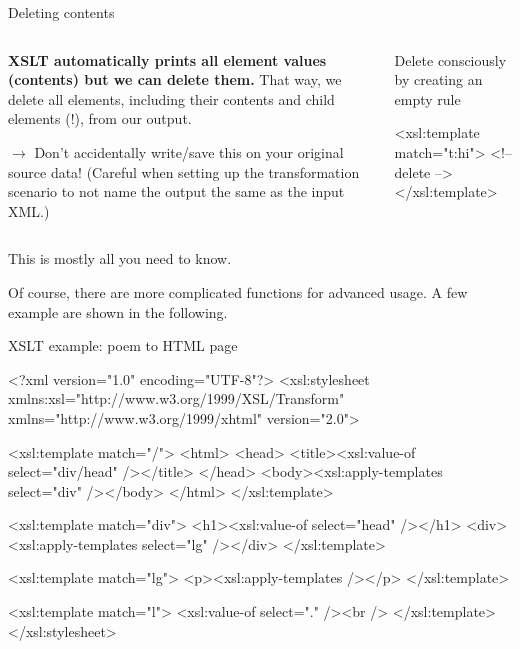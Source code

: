 \begin{frame}[fragile]{Deleting contents}
\small 

\begin{columns}
\begin{block}{}
\textbf{XSLT automatically prints all element values (contents) but we can delete them.} That way, we delete all elements, including their contents and child elements (!), from our output.

\alert{$\to$ Don't accidentally write/save this on your original source data!} (Careful when setting up the transformation scenario to not name the output the same as the input XML.)
\end{block}

\begin{block}{Delete consciously by creating an empty rule}
\begin{xmlcode}
    <xsl:template match="t:hi">
        <!-- delete -->
    </xsl:template>
\end{xmlcode}
\end{block}
\end{columns}

This is mostly all you need to know.

Of course, there are more complicated functions for advanced usage. A few example are shown in the following.

\end{frame}

\begin{frame}[fragile]{XSLT example: poem to HTML page}
\begin{xmlcode}
<?xml version="1.0" encoding="UTF-8"?>
<xsl:stylesheet xmlns:xsl="http://www.w3.org/1999/XSL/Transform"
    xmlns="http://www.w3.org/1999/xhtml" version="2.0">
    
    <xsl:template match="/">
        <html>
            <head>
                <title><xsl:value-of select="div/head" /></title>
            </head>
            <body><xsl:apply-templates select="div" /></body>
        </html>
    </xsl:template>
    
    <xsl:template match="div">
        <h1><xsl:value-of select="head" /></h1>
        <div><xsl:apply-templates select="lg" /></div>
    </xsl:template>
    
    <xsl:template match="lg">
        <p><xsl:apply-templates /></p>    
    </xsl:template>
    
    <xsl:template match="l">
        <xsl:value-of select="." /><br />
    </xsl:template>
</xsl:stylesheet>
\end{xmlcode}
\end{frame}

